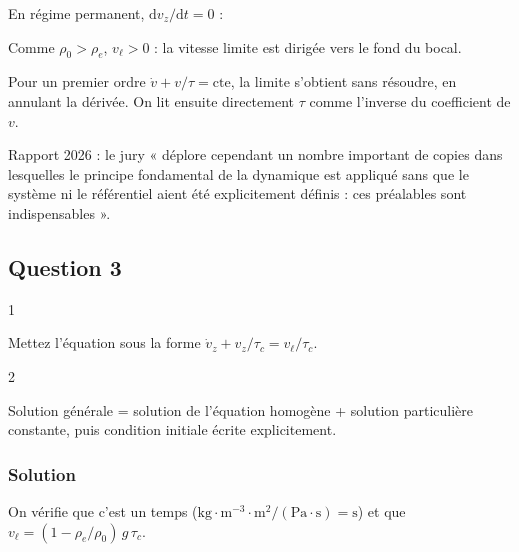 \documentclass[11pt,a4paper]{article}
\newcommand{\equationajustee}[1]{%
  \sbox{\boiteequation}{$\displaystyle #1$}%
  \ifdim\wd\boiteequation>\linewidth
    \[\resizebox{\linewidth}{!}{\usebox{\boiteequation}}\]%
  \else
    \[#1\]%
  \fi}
\begin{document}
En régime permanent, \(\mathrm dv_z/\mathrm dt=0\) :

\equationajustee{\boxed{v_\ell=\frac{2r^2(\rho_0-\rho_e)\,g}{9\eta}}}

Comme \(\rho_0>\rho_e\), \(v_\ell>0\) : la vitesse limite est dirigée vers le fond du bocal.

\begin{methode}

Pour un premier ordre \(\dot v+v/\tau=\text{cte}\), la limite s'obtient sans résoudre, en annulant la dérivée. On lit ensuite directement \(\tau\) comme l'inverse du coefficient de \(v\).

\end{methode}

\begin{jury}

Rapport 2026 : le jury « déplore cependant un nombre important de copies dans lesquelles le principe fondamental de la dynamique est appliqué sans que le système ni le référentiel aient été explicitement définis : ces préalables sont indispensables ».

\end{jury}

\hypertarget{question-3}{%
\subsection{Question 3}\label{question-3}}

\begin{indication}{1}

Mettez l'équation sous la forme \(\dot v_z+v_z/\tau_c=v_\ell/\tau_c\).

\end{indication}

\begin{indication}{2}

Solution générale = solution de l'équation homogène + solution particulière constante, puis condition initiale écrite explicitement.

\end{indication}

\hypertarget{solution-2}{%
\subsubsection{Solution}\label{solution-2}}

\equationajustee{\boxed{\tau_c=\frac{2\rho_0r^2}{9\eta}}}

On vérifie que c'est un temps (\(\mathrm{kg\cdot m^{-3}\cdot m^2/(Pa\cdot s)}=\mathrm s\)) et que \(v_\ell=(1-\rho_e/\rho_0)\,g\,\tau_c\).
\end{document}
